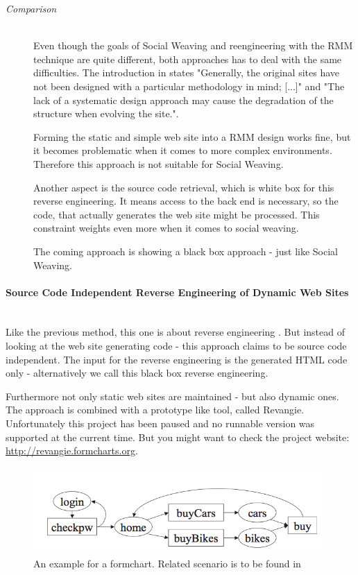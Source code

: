 \begin{enumerate}[A.]
\begin{description}
		\item[\emph{Comparison}]\mbox{}\\
		Even though the goals of Social Weaving and reengineering with the RMM technique are quite different, both approaches has to deal with the same difficulties. The introduction in \cite{antoniol2000web} states "Generally, the original sites have not been designed with a particular methodology in mind; [...]" and "The lack of a systematic design approach may cause the degradation of the structure when evolving the site.". 
		
		Forming the static and simple web site into a RMM design works fine, but it becomes problematic when it comes to more complex environments. Therefore this approach is not
 suitable for Social Weaving.
		
		Another aspect is the source code retrieval, which is white box for this reverse engineering. It means access to the back end is necessary, so the code, that actually generates the web site might be processed. This constraint weights even more when it comes to social weaving.
		
		The coming approach is showing a black box approach - just like Social Weaving. 
	\end{description}	 

	\paragraph{Source Code Independent Reverse Engineering of Dynamic Web Sites}\mbox{}\\ 	
	Like the previous method, this one is about reverse engineering \cite{draheim2005source}. But instead of looking at the web site generating code - this approach claims to be source code independent. The input for the reverse engineering is the generated HTML code only - alternatively we call this black box reverse engineering.
	
	Furthermore not only static web sites are maintained - but also dynamic ones. The approach is combined with a prototype like tool, called Revangie\cite{draheim2004generator}. Unfortunately this project has been paused and no runnable version was supported at the current time. But you might want to check the project website: \url{http://revangie.formcharts.org}. 
	
	\begin{figure}\centering
			\includegraphics[width=11cm]{images/revangie-formchart.png}
			\caption{An example for a formchart. Related scenario is to be found in \cite{draheim2005source}}
			\label{revangie-formchart}
	\end{figure} 
	

\end{enumerate}
